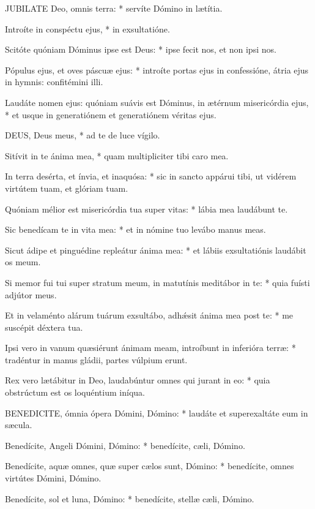 
\lettrine[lines=2]{J}{UBILATE} Deo, omnis terra: * servíte Dómino in lætítia.

Introíte in conspéctu ejus, * in exsultatióne.

Scitóte quóniam Dóminus ipse est Deus: * ipse fecit nos, et non ipsi nos.

Pópulus ejus, et oves páscuæ ejus: * introíte portas ejus in confessióne, átria ejus in hymnis: confitémini illi.

Laudáte nomen ejus: quóniam suávis est Dóminus, in ætérnum misericórdia ejus, * et usque in generatiónem et generatiónem véritas ejus.


\lettrine[lines=2]{D}{EUS}, Deus meus, * ad te de luce vígilo.

Sitívit in te ánima mea, * quam multipliciter tibi caro mea.

In terra desérta, et ínvia, et inaquósa: * sic in sancto appárui tibi, ut vidérem virtútem tuam, et glóriam tuam.

Quóniam mélior est misericórdia tua super vitas: * lábia mea laudábunt te.

Sic benedícam te in vita mea: * et in nómine tuo levábo manus meas.

Sicut ádipe et pinguédine repleátur ánima mea: * et lábiis exsultatiónis laudábit os meum.

Si memor fui tui super stratum meum, in matutínis meditábor in te: * quia fuísti adjútor meus.

Et in velaménto alárum tuárum exsultábo, adhǽsit ánima mea post te: * me suscépit déxtera tua.

Ipsi vero in vanum quæsiérunt ánimam meam, introíbunt in inferióra terræ: * tradéntur in manus gládii, partes vúlpium erunt.

Rex vero lætábitur in Deo, laudabúntur omnes qui jurant in eo: * quia obstrúctum est os loquéntium iníqua.


\lettrine[lines=2]{B}{ENEDICITE}, ómnia ópera Dómini, Dómino: * laudáte et superexaltáte eum in sæcula.

Benedícite, Angeli Dómini, Dómino: * benedícite, cæli, Dómino.

Benedícite, aquæ omnes, quæ super cælos sunt, Dómino: * benedícite, omnes virtútes Dómini, Dómino.

Benedícite, sol et luna, Dómino: * benedícite, stellæ cæli, Dómino.

